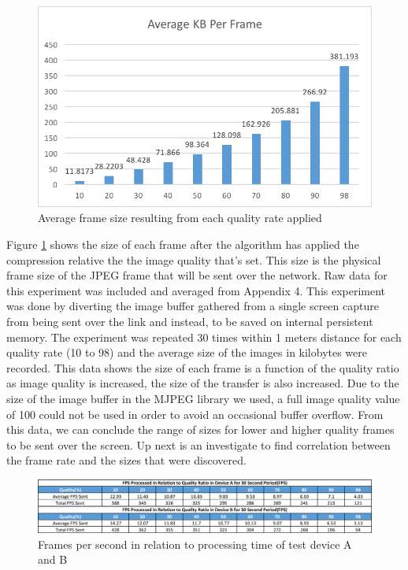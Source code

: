 \documentclass[a4paper,12pt]{article}
\begin{document}
\begin{figure}[h!]
\centering
\includegraphics[scale=1]{Figures/Figure10.png}
\caption{Average frame size resulting from each quality rate applied}
\label{fig:AvgFramesQuality}
\end{figure}

Figure \ref{fig:AvgFramesQuality} shows the size of each frame after the algorithm has applied the compression relative the the image quality that’s set. This size is the physical frame size of the JPEG frame that will be sent over the network. Raw data for this experiment was included and averaged from Appendix 4. This experiment was done by diverting the image buffer gathered from a single screen capture from being sent over the link and instead, to be saved on internal persistent memory. The experiment was repeated 30 times within 1 meters distance for each quality rate (10 to 98) and the average size of the images in kilobytes were recorded. This data shows the size of each frame is a function of the quality ratio as image quality is increased, the size of the transfer is also increased. Due to the size of the image buffer in the MJPEG library we used, a full image quality value of 100 could not be used in order to avoid an occasional buffer overflow. From this data, we can conclude the range of sizes for lower and higher quality frames to be sent over the screen. Up next is an investigate to find correlation between the frame rate and the sizes that were discovered. 

\begin{figure}[h!]
\centering
\includegraphics[scale=.7]{Figures/Figure11.png}
\caption{Frames per second in relation to processing time of test device A and B}
\label{fig:FPSprocessingTime}
\end{figure}
\end{document}
